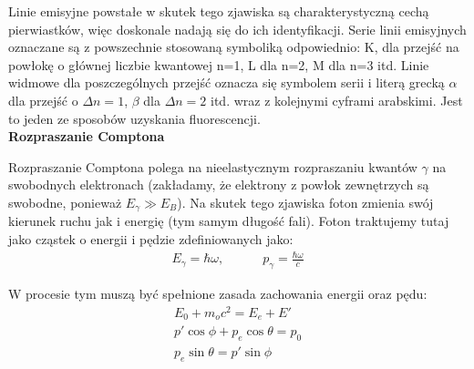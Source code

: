 \documentclass{article}
\begin{document}
\begin{enumerate}
Linie emisyjne powstałe w skutek tego zjawiska są charakterystyczną cechą pierwiastków, więc doskonale nadają się do ich identyfikacji. Serie linii emisyjnych oznaczane są z powszechnie stosowaną symboliką odpowiednio: K, dla przejść na powłokę o głównej liczbie kwantowej n=1, L dla n=2, M dla n=3 itd. Linie widmowe dla poszczególnych przejść oznacza się symbolem serii i literą grecką $\alpha$ dla przejść o $\Delta n =1$, $\beta$ dla $\Delta n=2$ itd. wraz z kolejnymi cyframi arabskimi.
Jest to jeden ze sposobów uzyskania fluorescencji.\\
{\bf Rozpraszanie Comptona}

Rozpraszanie Comptona polega na nieelastycznym rozpraszaniu kwantów $\gamma$ na swobodnych elektronach (zakładamy, że elektrony z powłok zewnętrzych są swobodne, ponieważ $E_{\gamma}\gg E_B$). Na skutek tego zjawiska foton zmienia swój kierunek ruchu jak i energię (tym samym długość fali). Foton traktujemy tutaj jako cząstek o energii i pędzie zdefiniowanych jako:
 \begin{gather*}
E_{\gamma}=\hbar\omega, \quad \quad \quad p_{\gamma}=\frac{\hbar\omega}{c}
\end{gather*}
\begin{minipage}[h]{0.5\linewidth}
\centering
{}
\end{minipage}
\begin{minipage}[h]{0.5\linewidth}
\centering
W procesie tym muszą być spełnione zasada zachowania energii oraz pędu:\\ 
 \begin{gather*}
E_0+m_oc^2=E_e+E'\\
p'\cos{\phi}+p_e\cos{\theta}=p_0\\
p_e\sin{\theta}=p'\sin{\phi}
\end{gather*}
\end{minipage}


\end{enumerate}
\end{document}

